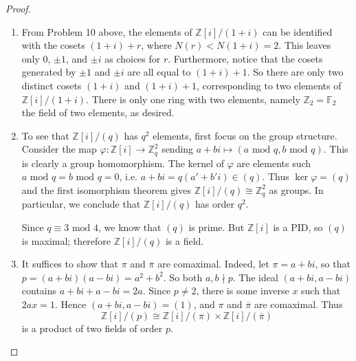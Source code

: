 \documentclass[12pt]{article}
\theoremstyle{remark}
\theoremstyle{named}
\newcommand{\Z}{\mathbb Z}
\renewcommand{\mod}{\text{ mod }}
\begin{document}
\begin{proof}
    \hspace*{0in}
    \begin{enumerate}
        \item From Problem 10 above, the elements of \(\Z[i] / (1 + i)\) can be identified with the cosets \((1 + i) + r\), where \(N(r) < N(1 + i) = 2\). This leaves only \(0\), \(\pm 1\), and \(\pm i\) as choices for \(r\). Furthermore, notice that the cosets generated by \(\pm 1\) and \(\pm i\) are all equal to \((1 + i) + 1\). So there are only two distinct cosets \((1 + i)\) and \((1 + i) + 1\), corresponding to two elements of \(\Z[i] / (1 + i)\). There is only one ring with two elements, namely \(\Z_2 = \mathbb F_2\) the field of two elements, as desired. 
        \item To see that \(\Z[i] / (q)\) has \(q^2\) elements, first focus on the group structure. Consider the map \(\varphi : \Z[i] \to \Z_q^2\) sending \(a + bi \mapsto (a \mod q, b \mod q)\). This is clearly a group homomorphism. The kernel of \(\varphi\) are elements such \(a \mod q = b \mod q = 0\), i.e. \(a + bi = q(a' + b'i) \in (q)\). Thus \(\ker \varphi = (q)\) and the first isomorphism theorem gives \(\Z[i] / (q) \cong \Z_q^2\) as groups. In particular, we conclude that \(\Z[i] / (q)\) has order \(q^2\).
        
        Since \(q \equiv 3 \mod 4\), we know that \((q)\) is prime. But \(\Z[i]\) is a PID, so \((q)\) is maximal; therefore \(\Z[i] / (q)\) is a field. 
        \item It suffices to show that \(\pi\) and \(\overline{\pi}\) are comaximal. Indeed, let \(\pi = a + bi\), so that \(p = (a + bi)(a - bi) = a^2 + b^2\). So both \(a, b \nmid p\). The ideal \((a + bi, a - bi)\) contains \(a + bi + a - bi = 2a\). Since \(p \neq 2\), there is some inverse \(x\) such that \(2ax = 1\). Hence \((a + bi, a - bi) = (1)\), and \(\pi\) and \(\overline{\pi}\) are comaximal. Thus 
        \[\Z[i] / (p) \cong \Z[i] / (\pi) \times \Z[i] / (\overline{\pi})\]
        is a product of two fields of order \(p\).
    \end{enumerate}
\end{proof}
\end{document}
